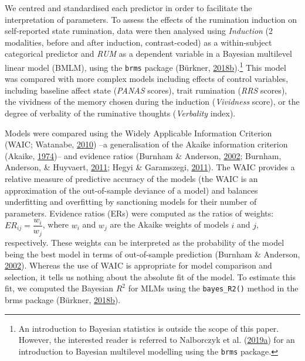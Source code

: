 \documentclass[a4paper,12pt,twoside,onecolumn,openright,final,oldfontcommands]{memoir}
\let\rmarkdownfootnote\footnote%
\def\footnote{\protect\rmarkdownfootnote}
\begin{document}
We centred and standardised each predictor in order to facilitate the interpretation of parameters. To assess the effects of the rumination induction on self-reported state rumination, data were then analysed using \emph{Induction} (2 modalities, before and after induction, contrast-coded) as a within-subject categorical predictor and \emph{RUM} as a dependent variable in a Bayesian multilevel linear model (BMLM), using the \texttt{brms} package (Bürkner, \protect\hyperlink{ref-R-brms}{2018}\protect\hyperlink{ref-R-brms}{b}).\footnote{An introduction to Bayesian statistics is outside the scope of this paper. However, the interested reader is referred to Nalborczyk et al. (\protect\hyperlink{ref-nalborczyk_introduction_2019}{2019}\protect\hyperlink{ref-nalborczyk_introduction_2019}{a}) for an introduction to Bayesian multilevel modelling using the \texttt{brms} package.} This model was compared with more complex models including effects of control variables, including baseline affect state (\emph{PANAS} scores), trait rumination (\emph{RRS} scores), the vividness of the memory chosen during the induction (\emph{Vividness} score), or the degree of verbality of the ruminative thoughts (\emph{Verbality} index).

Models were compared using the Widely Applicable Information Criterion (WAIC; Watanabe, \protect\hyperlink{ref-watanabe_asymptotic_2010}{2010}) --a generalisation of the Akaike information criterion (Akaike, \protect\hyperlink{ref-akaike_new_1974}{1974})-- and evidence ratios (Burnham \& Anderson, \protect\hyperlink{ref-burnham_model_2002}{2002}; Burnham, Anderson, \& Huyvaert, \protect\hyperlink{ref-burnham_aic_2011}{2011}; Hegyi \& Garamszegi, \protect\hyperlink{ref-hegyi_using_2011}{2011}). The WAIC provides a relative measure of predictive accuracy of the models (the WAIC is an approximation of the out-of-sample deviance of a model) and balances underfitting and overfitting by sanctioning models for their number of parameters. Evidence ratios (ERs) were computed as the ratios of weights: \(ER_{ij} = \dfrac{w_{i}}{w_{j}}\), where \(w_{i}\) and \(w_{j}\) are the Akaike weights of models \(i\) and \(j\), respectively. These weights can be interpreted as the probability of the model being the best model in terms of out-of-sample prediction (Burnham \& Anderson, \protect\hyperlink{ref-burnham_model_2002}{2002}). Whereas the use of WAIC is appropriate for model comparison and selection, it tells us nothing about the absolute fit of the model. To estimate this fit, we computed the Bayesian \(R^2\) for MLMs using the \texttt{bayes\_R2()} method in the brms package (Bürkner, \protect\hyperlink{ref-R-brms}{2018}\protect\hyperlink{ref-R-brms}{b}).
\end{document}
